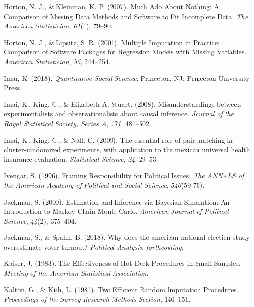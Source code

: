 \documentclass[12pt,econ]{sources/authesis}
\begin{document}
\leavevmode\hypertarget{ref-horton_2007_much}{}%
Horton, N. J., \& Kleinman, K. P. (2007). Much Ado About Nothing: A Comparison of Missing Data Methods and Software to Fit Incomplete Data. \emph{The American Statistician}, \emph{61}(1), 79--90.

\leavevmode\hypertarget{ref-horton_2001_multiple}{}%
Horton, N. J., \& Lipsitz, S. R. (2001). Multiple Imputation in Practice: Comparison of Software Packages for Regression Models with Missing Variables. \emph{American Statistician}, \emph{55}, 244--254.

\leavevmode\hypertarget{ref-imai_quantitative_2018}{}%
Imai, K. (2018). \emph{Quantitative Social Science}. Princeton, NJ: Princeton University Press.

\leavevmode\hypertarget{ref-imai_2008_misunderstandings}{}%
Imai, K., King, G., \& Elizabeth A. Stuart. (2008). Misunderstandings between experimentalists and observationalists about causal inference. \emph{Journal of the Royal Statistical Society, Series A}, \emph{171}, 481--502.

\leavevmode\hypertarget{ref-imai_2009_essential}{}%
Imai, K., King, G., \& Nall, C. (2009). The essential role of pair-matching in cluster-randomized experiments, with application to the mexican universal health insurance evaluation. \emph{Statistical Science}, \emph{24}, 29--53.

\leavevmode\hypertarget{ref-iyengar_framing_1996}{}%
Iyengar, S. (1996). Framing Responsibility for Political Issues. \emph{The ANNALS of the American Academy of Political and Social Science}, \emph{546}(59-70).

\leavevmode\hypertarget{ref-jackman_2000_estimation}{}%
Jackman, S. (2000). Estimation and Inference via Bayesian Simulation: An Introduction to Markov Chain Monte Carlo. \emph{American Journal of Political Science}, \emph{44}(2), 375--404.

\leavevmode\hypertarget{ref-jackman_2018_does}{}%
Jackman, S., \& Spahn, B. (2018). Why does the american national election study overestimate voter turnout? \emph{Political Analysis}, \emph{forthcoming}.

\leavevmode\hypertarget{ref-kaiser_1983_effectiveness}{}%
Kaiser, J. (1983). The Effectiveness of Hot-Deck Procedures in Small Samples. \emph{Meeting of the American Statistical Association}.

\leavevmode\hypertarget{ref-kalton_1981_efficient}{}%
Kalton, G., \& Kish, L. (1981). Two Efficient Random Imputation Procedures. \emph{Proceedings of the Survey Research Methods Section}, 146--151.
\end{document}
